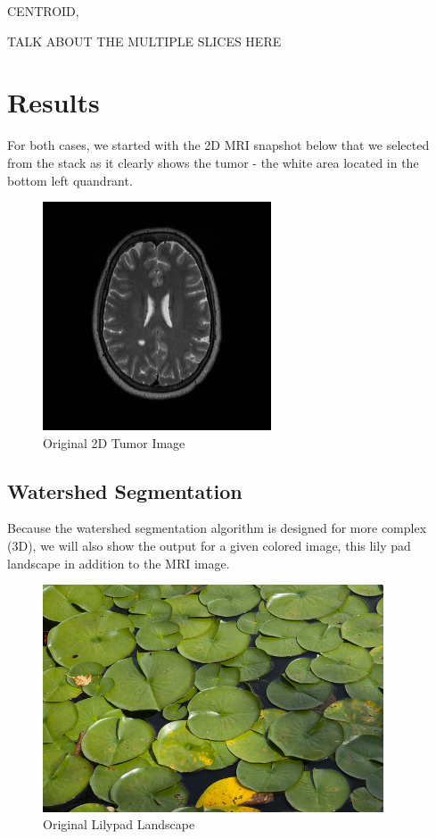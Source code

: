 \documentclass[12pt]{article}
\theoremstyle{plain}%
\theoremstyle{definition}
\theoremstyle{remark}
\begin{document}
CENTROID,

TALK ABOUT THE MULTIPLE SLICES HERE

\section{Results}

For both cases, we started with the 2D MRI snapshot below that we selected from the stack as it clearly shows the tumor - the white area located in the bottom left quandrant.

\begin{figure}[!h]
	\centering
		\includegraphics{original.jpg}
	\caption{Original 2D Tumor Image}
\end{figure}

\subsection{Watershed Segmentation}

Because the watershed segmentation algorithm is designed for more complex (3D), we will also show the output for a given colored image, this lily pad landscape in addition to the MRI image.

\begin{figure}[!h]
	\centering
		\includegraphics[width=0.9\textwidth]{lilypad.jpg}
	\caption{Original Lilypad Landscape}
\end{figure}
\end{document}
